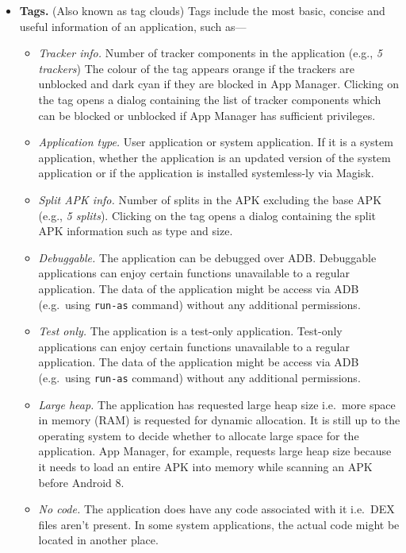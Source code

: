 \begin{itemize}
    \item \textbf{Tags.} (Also known as tag clouds) Tags include the most basic, concise and useful information of an
    application, such as---
    \begin{itemize}
        \item \textit{Tracker info.} Number of tracker components in the application (e.g., \textit{5 trackers}) The
        colour of the tag appears orange if the trackers are unblocked and dark cyan if they are blocked in App Manager.
        Clicking on the tag opens a dialog containing the list of tracker components which can be blocked or unblocked
        if App Manager has sufficient privileges.
        \item \textit{Application type.} User application or system application. If it is a system application, whether
        the application is an updated version of the system application or if the application is installed systemless-ly
        via Magisk.
        \item \textit{Split APK info.} Number of splits in the APK excluding the base APK (e.g., \textit{5 splits}).
        Clicking on the tag opens a dialog containing the split APK information such as type and size.
        \item \textit{Debuggable.} The application can be debugged over ADB\@. Debuggable applications can enjoy certain
        functions unavailable to a regular application. The data of the application might be access via ADB (e.g.\ using
        \texttt{run-as} command) without any additional permissions.
        \item \textit{Test only.} The application is a test-only application. Test-only applications can enjoy certain
        functions unavailable to a regular application. The data of the application might be access via ADB (e.g.\ using
        \texttt{run-as} command) without any additional permissions.
        \item \textit{Large heap.} The application has requested large heap size i.e.\ more space in memory (RAM) is
        requested for dynamic allocation. It is still up to the operating system to decide whether to allocate large
        space for the application. App Manager, for example, requests large heap size because it needs to load an entire
        APK into memory while scanning an APK before Android 8.
        \item \textit{No code.} The application does have any code associated with it i.e.\ DEX files aren't present.
        In some system applications, the actual code might be located in another place.

\end{itemize}
\end{itemize}
